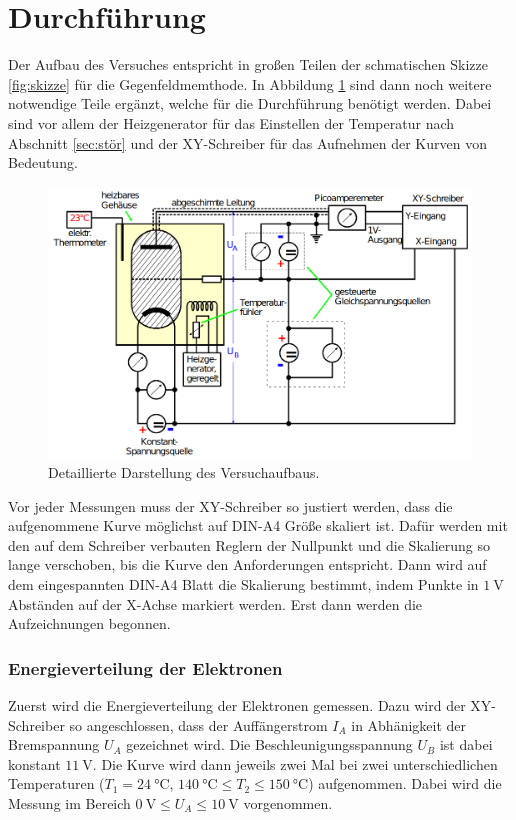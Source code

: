 \section{Durchführung}
\label{sec:Durchführung}
Der Aufbau des Versuches entspricht in großen Teilen der schmatischen Skizze \ref{fig:skizze} für die Gegenfeldmemthode. In Abbildung
\ref{fig:aufbau} sind dann noch weitere notwendige Teile ergänzt, welche für die Durchführung benötigt werden. Dabei sind vor allem der
Heizgenerator für das Einstellen der Temperatur nach Abschnitt \ref{sec:stör} und der XY-Schreiber für das Aufnehmen der Kurven von
Bedeutung.
\begin{figure}[H]
    \centering
    \includegraphics[scale = 0.5]{pictures/Aufbau2.png}
    \caption{Detaillierte Darstellung des Versuchaufbaus. \cite{AP01}}
    \label{fig:aufbau}
\end{figure}
\noindent
Vor jeder Messungen muss der XY-Schreiber so justiert werden, dass die aufgenommene Kurve möglichst auf DIN-A4 Größe skaliert ist.
Dafür werden mit den auf dem Schreiber verbauten Reglern der Nullpunkt und die Skalierung so lange verschoben, bis die Kurve den Anforderungen
entspricht. Dann wird auf dem eingespannten DIN-A4 Blatt die Skalierung bestimmt, indem Punkte in $\SI{1}{\volt}$ Abständen auf der
X-Achse markiert werden. Erst dann werden die Aufzeichnungen begonnen.

\subsubsection*{Energieverteilung der Elektronen}
Zuerst wird die Energieverteilung der Elektronen gemessen. Dazu wird der XY-Schreiber so angeschlossen, dass der Auffängerstrom $I_A$ in
Abhänigkeit der Bremspannung $U_A$ gezeichnet wird. Die Beschleunigungsspannung $U_B$ ist dabei konstant $\SI{11}{\volt}$. Die Kurve
wird dann jeweils zwei Mal bei zwei unterschiedlichen Temperaturen ($T_1=\SI{24}{\celsius}$,
$\SI{140}{\celsius} \leq T_2 \leq \SI{150}{\celsius}$) aufgenommen. Dabei wird die Messung im Bereich $\SI{0}{\volt} \leq U_A \leq
\SI{10}{\volt}$ vorgenommen.

